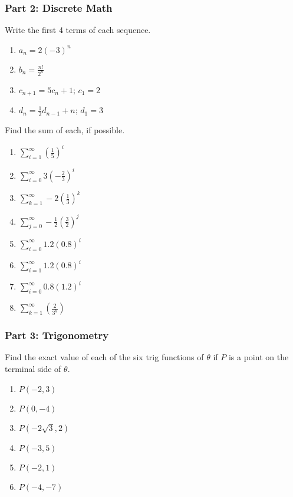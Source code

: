 \documentclass{article}
\newcounter{Review}
\begin{document}
\subsubsection*{Part 2: Discrete Math}

Write the first 4 terms of each sequence.
\begin{enumerate}   \setcounter{enumi}{\value{Review}}
	\item $a_n = 2(-3)^n$
	\item $b_n = \frac{n!}{2^n}$
	\item $c_{n+1} = 5c_n + 1; \, c_1 = 2$
	\item $d_{n} = \frac{1}{2}d_{n-1} + n; \, d_1 = 3$
\end{enumerate}	\setcounter{Review}{\value{enumi}}

Find the sum of each, if possible.

\begin{enumerate}   \setcounter{enumi}{\value{Review}}
    \item $\sum_{i=1}^{\infty} \left(\frac{1}{5}\right)^i$
    \item $\sum_{i=0}^{\infty} 3\left(-\frac{2}{3}\right)^i$
    \item $\sum_{k=1}^{\infty} -2\left(\frac{1}{3}\right)^k$
    \item $\sum_{j=0}^{\infty} -\frac{1}{2}\left(\frac{3}{2}\right)^j$
    \item $\sum_{i=0}^{\infty} 1.2(0.8)^i$
	\item $\sum_{i=1}^{\infty} 1.2(0.8)^i$
	\item $\sum_{i=0}^{\infty} 0.8(1.2)^i$
	\item $\sum_{k=1}^{\infty} \left(\frac{2}{3^k}\right)$
\setcounter{Review}{\value{enumi}}
\end{enumerate}

\subsubsection*{Part 3: Trigonometry}

Find the exact value of each of the six trig functions of $\theta$ if $P$ is a point on the terminal side of $\theta$.

\begin{enumerate}   \setcounter{enumi}{\value{Review}}
	\item $P(-2, 3)$
	\item $P(0,-4)$
	\item $P(-2\sqrt{3}, 2)$
	\item $P(-3, 5)$
	\item $P(-2, 1)$
	\item $P(-4, -7)$
\end{enumerate}	\setcounter{Review}{\value{enumi}}
\end{document}
